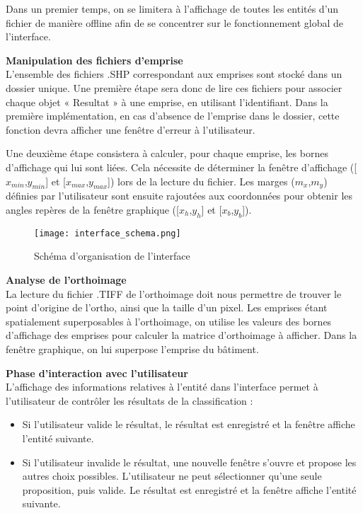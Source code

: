 Dans un premier temps, on se limitera à l’affichage de toutes les entités d’un fichier de manière offline afin de se concentrer sur le fonctionnement global de l’interface.


\noindent\textbf{Manipulation des fichiers d'emprise}\\

L’ensemble des fichiers .SHP correspondant aux emprises sont stocké dans un dossier unique. Une première étape sera donc de lire ces fichiers pour associer chaque objet « Resultat » à une emprise, en utilisant l’identifiant. Dans la première implémentation, en cas d’absence de l’emprise dans le dossier, cette fonction devra afficher une fenêtre d’erreur à l’utilisateur.\newline

Une deuxième étape consistera à calculer, pour chaque emprise, les bornes d’affichage qui lui sont liées. Cela nécessite de déterminer la fenêtre d’affichage ([$x_{min}$,$y_{min}$] et [$x_{max}$,$y_{max}$]) lors de la lecture du fichier. Les marges ($m_x$,$m_y$) définies par l’utilisateur sont ensuite rajoutées aux coordonnées pour obtenir les angles repères de la fenêtre graphique ([$x_h$,$y_h$] et [$x_b$,$y_b$]).\newline

\begin{figure}[!h]
	\begin{center}
		\texttt{[image: interface\_schema.png]}  \\
		\caption[Schéma d'organisation de l'interface]{Schéma d'organisation de l'interface}
		\label{fig:interfaceschema}
	\end{center}
\end{figure}

\noindent\textbf{Analyse de l'orthoimage}\\

La lecture du fichier .TIFF de l’orthoimage doit nous permettre de trouver le point d’origine de l’ortho, ainsi que la taille d’un pixel. Les emprises étant spatialement superposables à l’orthoimage, on utilise les valeurs des bornes d’affichage des emprises pour calculer la matrice d’orthoimage à afficher. Dans la fenêtre graphique, on lui superpose l’emprise du bâtiment.\newline

\noindent\textbf{Phase d'interaction avec l'utilisateur}\\

L’affichage des informations relatives à l’entité dans l’interface permet à l’utilisateur de contrôler les résultats de la classification :
\begin{itemize}[label=$\rightarrow$]
	\item Si l’utilisateur valide le résultat, le résultat est enregistré et la fenêtre affiche l’entité suivante.
	\item Si l’utilisateur invalide le résultat, une nouvelle fenêtre s’ouvre et propose les autres choix possibles. L’utilisateur ne peut sélectionner qu’une seule proposition, puis valide. Le résultat est enregistré et la fenêtre affiche l’entité suivante.
\end{itemize}

